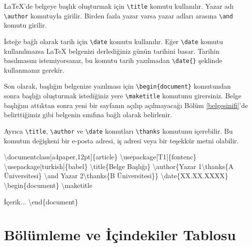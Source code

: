 \documentclass[
  10pt,
]{scrbook}
\newenvironment{Shaded}{\begin{snugshade}}{\end{snugshade}}
\newcommand{\DecValTok}[1]{\textcolor[rgb]{0.00,0.00,0.81}{#1}}
\newcommand{\NormalTok}[1]{#1}
\begin{document}
LaTeX'de belgeye başlık oluşturmak için \texttt{\textbackslash{}title} komutu kullanılır.
Yazar adı \texttt{\textbackslash{}author} komutuyla girilir. Birden fazla yazar varsa yazar
adları arasına \texttt{\textbackslash{}and} komutu girilir.

İsteğe bağlı olarak tarih için \texttt{\textbackslash{}date} komutu kullanılır. Eğer \texttt{\textbackslash{}date}
komutu kullanılmazsa LaTeX belgenizi derlediğiniz günün tarihini basar.
Tarihin basılmasını istemiyorsanız, bu komutu tarih yazılmadan \texttt{\textbackslash{}date\{\}}
şeklinde kullanmanız gerekir.

Son olarak, başlığın belgenize yazılması için \texttt{\textbackslash{}begin\{document\}}
komutundan sonra başlığı oluşturmak istediğiniz yere \texttt{\textbackslash{}maketitle}
komutunu girersiniz. Belge başlığını attıktan sonra yeni bir sayfanın
açılıp açılmayacağı
Bölüm \ref{belgesinifi}'de belirttiğimiz gibi belgenin sınıfına bağlı
olarak belirlenir.

Ayrıca \texttt{\textbackslash{}title}, \texttt{\textbackslash{}author} ve \texttt{\textbackslash{}date} komutları \texttt{\textbackslash{}thanks} komutunu
içerebilir. Bu komutun değişkeni bir e-posta adresi, iş adresi veya bir
teşekkür metni olabilir.

\begin{Shaded}
\begin{Highlighting}[]
\NormalTok{\textbackslash{}documentclass[a4paper,12pt]\{article\}}
\NormalTok{\textbackslash{}usepackage[T1]\{fontenc\}}
\NormalTok{\textbackslash{}usepackage[turkish]\{babel\}}
\NormalTok{\textbackslash{}title\{Belge Başlığı\}}
\NormalTok{\textbackslash{}author\{Yazar }\DecValTok{1}\NormalTok{\textbackslash{}thanks\{A Üniversitesi\} \textbackslash{}and Yazar }\DecValTok{2}\NormalTok{\textbackslash{}thanks\{B Üniversitesi\}\}}
\NormalTok{\textbackslash{}date\{XX.XX.XXXX\}}
\NormalTok{\textbackslash{}begin\{document\}}
\NormalTok{\textbackslash{}maketitle}

\NormalTok{İçerik...}
\NormalTok{\textbackslash{}end\{document\}}
\end{Highlighting}
\end{Shaded}

\hypertarget{buxf6luxfcmleme-ve-iuxe7indekiler-tablosu}{%
\section{Bölümleme ve İçindekiler Tablosu}\label{buxf6luxfcmleme-ve-iuxe7indekiler-tablosu}}
\end{document}
